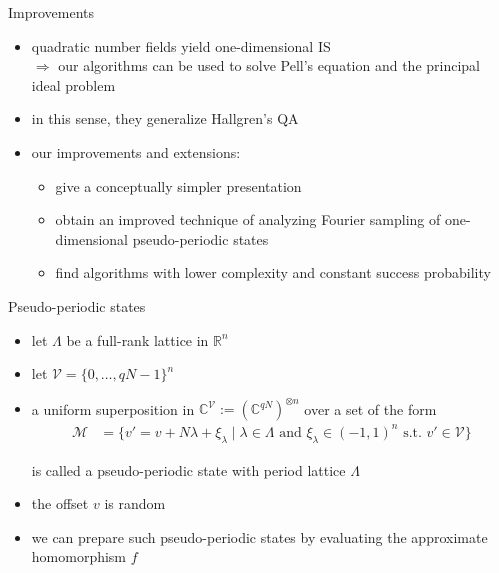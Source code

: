 \documentclass[slideColor]{prosper}
\renewcommand{\R}{\mathbb{R}}
\renewcommand{\>}{\rangle}
\newcommand{\<}{\langle}
\begin{document}
\begin{slide}{Improvements}
\vspace{-0.4cm}
\begin{itemize}
\item quadratic number fields yield one-dimensional IS\\ $\Rightarrow$ 
our algorithms can be used to solve Pell's equation and the principal ideal problem

\medskip
\item in this sense, they generalize Hallgren's QA

\medskip
\item our improvements and extensions:

\medskip
\begin{itemize}
\item give a conceptually simpler presentation 

\medskip
\item obtain an improved technique of analyzing Fourier sampling of one-dimensional pseudo-periodic states

\medskip
\item find algorithms with lower complexity and constant success probability
\end{itemize}
\end{itemize}
\end{slide}





\begin{slide}{Pseudo-periodic states}
\vspace{-0.25cm}
\begin{itemize}
\item let $\Lambda$ be a full-rank lattice in $\R^n$

\medskip
\item let $\mathcal{V}=\{0,\ldots,qN-1\}^n$

\bigskip
\item a uniform superposition in $\mathbb{C}^\mathcal{V}:={(\mathbb{C}^{qN})}^{\otimes n}$ over a set of the form
\begin{align*}
\mathcal{M}  & = \{ v' = v + N \lambda + \xi_\lambda \mid \lambda\in\Lambda \text{ and } \xi_\lambda\in(-1,1)^n \text{ s.t. } v'\in\mathcal{V} \}
\end{align*}

is called a pseudo-periodic state with period lattice $\Lambda$

\bigskip
\item the offset $v$ is random

\medskip
\item we can prepare such pseudo-periodic states by evaluating the approximate homomorphism $f$ 
\end{itemize}
\end{slide}
\end{document}
